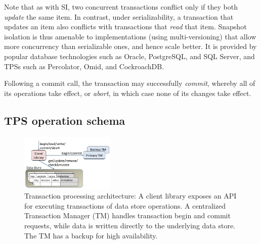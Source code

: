 {Note that as with SI, two concurrent transactions conflict only if they both \emph{update} the same item.  
In contrast, under serializability, a transaction that updates an item also conflicts with transactions that \emph{read} that item. 
Snapshot isolation is thus amenable to implementations (using multi-versioning) that 
allow more concurrency than serializable ones, and hence scale better.
It is provided by popular database technologies such as Oracle, PostgreSQL, and SQL Server,
and TPSs such as Percolator, Omid, and  CockroachDB.

Following a commit call, the transaction may successfully \emph{commit}, whereby all of its operations take effect, 
or 
\emph{abort}, in which case none of its changes take effect. 








\subsection{TPS operation schema}
\label{ssec:schema}

\begin{figure}
\centerline{
\includegraphics[width=0.40\textwidth]{FragolaComponents.jpg}
}
\caption{\small Transaction processing architecture: A client library exposes an  API for  executing transactions of data store operations. 
A centralized Transaction Manager (TM) handles transaction begin and commit requests, while data is written directly to the 
underlying data store. The TM has a backup for high availability.}
\label{fig:components}
\end{figure}

}
